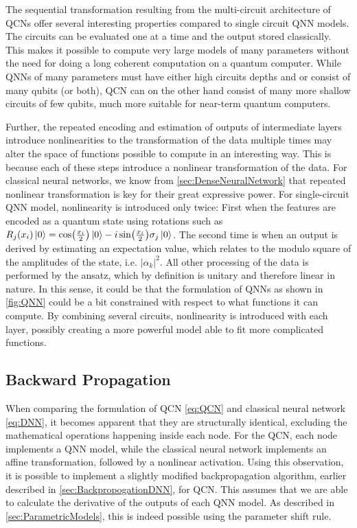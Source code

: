 The sequential transformation resulting from the multi-circuit architecture of QCNs offer several interesting properties compared to single circuit QNN models. The circuits can be evaluated one at a time and the output stored classically. This makes it possible to compute very large models of many parameters without the need for doing a long coherent computation on a quantum computer. While QNNs of many parameters must have either high circuits depths and or consist of many qubits (or both), QCN can on the other hand consist of many more shallow circuits of few qubits, much more suitable for near-term quantum computers. 

Further, the repeated encoding and estimation of outputs of intermediate layers introduce nonlinearities to the transformation of the data multiple times may alter the space of functions possible to compute in an interesting way. This is because each of these steps introduce a nonlinear transformation of the data. For classical neural networks, we know from \cref{sec:DenseNeuralNetwork} that repeated nonlinear transformation is key for their great expressive power. For single-circuit QNN model, nonlinearity is introduced only twice: First when the features are encoded as a quantum state using rotations such as $R_j(x_i)\ket{0} = \cos(\frac{x_i}{2})\ket{0} - i\sin(\frac{x_i}{2})\sigma_j\ket{0}$. The second time is when an output is derived by estimating an expectation value, which relates to the modulo square of the amplitudes of the state, i.e. $|\alpha_k|^2$. All other processing of the data is performed by the ansatz, which by definition is unitary and therefore linear in nature. In this sense, it could be that the formulation of QNNs as shown in \cref{fig:QNN} could be a bit constrained with respect to what functions it can compute. By combining several circuits, nonlinearity is introduced with each layer, possibly creating a more powerful model able to fit more complicated functions.  



\subsection{Backward Propagation}\label{sec:BackwardPropagationQCN}
When comparing the formulation of QCN \cref{eq:QCN} and classical neural network \cref{eq:DNN}, it becomes apparent that they are structurally identical, excluding the mathematical operations happening inside each node. For the QCN, each node implements a QNN model, while the classical neural network implements an affine transformation, followed by a nonlinear activation. Using this observation, it is possible to implement a slightly modified backpropagation algorithm, earlier described in \cref{sec:BackpropogationDNN}, for QCN. This assumes that we are able to calculate the derivative of the outputs of each QNN model. As described in \cref{sec:ParametricModels}, this is indeed possible using the parameter shift rule. 

